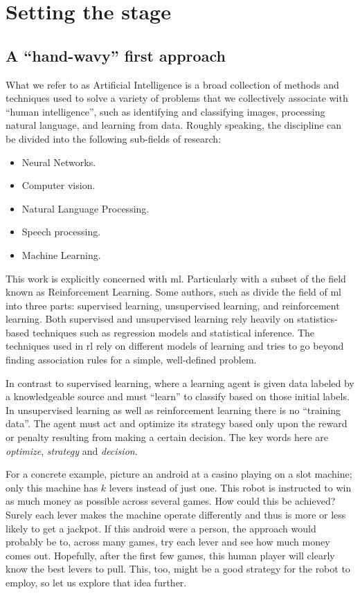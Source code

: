 \chapter{Setting the stage}
\label{chapter:Motivation}
\section{A ``hand-wavy'' first approach}

What we refer to as Artificial Intelligence is a broad collection of methods and
techniques used to solve a variety of problems that we collectively associate
with ``human intelligence'', such as identifying and classifying images, 
processing natural language, and learning from data. Roughly speaking, the
discipline can be divided into the following sub-fields of research:

\begin{itemize}
	\item Neural Networks.
	\item Computer vision.
	\item Natural Language Processing.
	\item Speech processing.
	\item Machine Learning.
\end{itemize}

This work is explicitly concerned with \ac{ml}. Particularly with a
subset of the field known as Reinforcement Learning. Some authors, such as
\cite[Ch.~1]{SuttonBarto} divide the field of \ac{ml} into three parts:
supervised learning, unsupervised learning, and reinforcement learning. Both
supervised and unsupervised learning rely heavily on statistics-based
techniques such as regression models and statistical inference. The techniques
used in \ac{rl} rely on different models of learning and tries to go
beyond finding association rules for a simple, well-defined problem.

In contrast to supervised learning, where a learning agent is given data labeled
by a knowledgeable source and must ``learn'' to classify based on those initial
labels. In unsupervised learning as well as reinforcement learning there is no
``training data''. The agent must act and optimize its strategy based only upon
the reward or penalty resulting from making a certain decision. The key words
here are \textit{optimize},  \textit{strategy} and \textit{decision}.

For a concrete example, picture an android at a casino playing on a slot
machine; only this machine has $k$ levers instead of just one. This robot is
instructed to win as much money as possible across several games. How could this
be achieved? Surely each lever makes the machine operate differently and thus is
more or less likely to get a jackpot.  If this android were a person, the
approach would probably be to, across many games, try each lever and see how
much money comes out. Hopefully, after the first few games, this human player
will clearly know the best levers to pull.  This, too, might be a good strategy
for the robot to employ, so let us explore that idea further.

